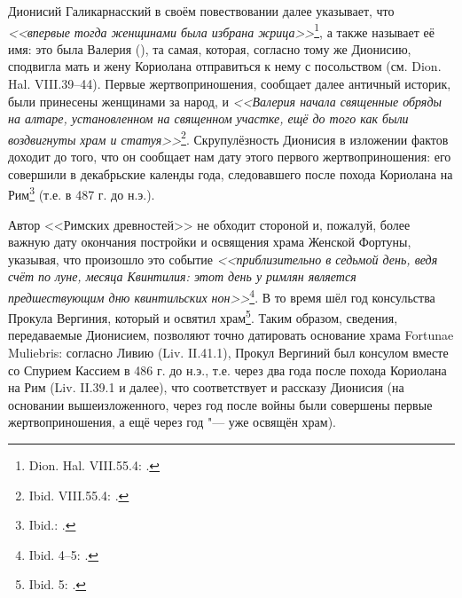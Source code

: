 Дионисий Галикарнасский в своём повествовании далее указывает, что \textit{<<впервые тогда женщинами была избрана жрица>>}\footnote{Dion. Hal. VIII.55.4: .}, а также называет её имя: это была Валерия (), та самая, которая, согласно тому же Дионисию, сподвигла мать и жену Кориолана отправиться к нему с посольством (см. Dion. Hal. VIII.39--44). Первые жертвоприношения, сообщает далее античный историк, были принесены женщинами за народ, и \textit{<<Валерия начала священные обряды на алтаре, установленном на священном участке, ещё до того как были воздвигнуты храм и статуя>>}\footnote{Ibid. VIII.55.4: .}. Скрупулёзность Дионисия в изложении фактов доходит до того, что он сообщает нам дату этого первого жертвоприношения: его совершили в декабрьские календы года, следовавшего после похода Кориолана на Рим\footnote{Ibid.: .} (т.е. в 487 г. до н.э.).

Автор <<Римских древностей>> не обходит стороной и, пожалуй, более важную дату окончания постройки и освящения храма Женской Фортуны, указывая, что произошло это событие \textit{<<приблизительно в седьмой день, ведя счёт по луне, месяца Квинтилия: этот день у римлян является предшествующим дню квинтильских нон>>}\footnote{Ibid. 4--5: .}. В то время шёл год консульства Прокула Вергиния, который и освятил храм\footnote{Ibid. 5: .}. Таким образом, сведения, передаваемые Дионисием, позволяют точно датировать основание храма Fortunae Muliebris: согласно Ливию (Liv. II.41.1), Прокул Вергиний был консулом вместе со Спурием Кассием в 486 г. до н.э., т.е. через два года после похода Кориолана на Рим (Liv. II.39.1 и далее), что соответствует и рассказу Дионисия (на основании вышеизложенного, через год после войны были совершены первые жертвоприношения, а ещё через год "--- уже освящён храм).


